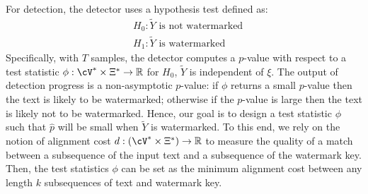%
For detection, the detector uses a hypothesis test defined as:
%
\begin{align}
    &H_0: \widetilde{Y} \text{ is not watermarked} \\
    &H_1: \widetilde{Y} \text{ is watermarked}
    \label{eq:hypothesis-test}
\end{align}
%
Specifically, with $T$ samples, the detector computes a $p$-value with respect to a test statistic $\phi: \cV^* \times \Xi^* \rightarrow \mathbb{R}$ for $H_0$, \ie $\widetilde{Y}$ is independent of $\xi$. The output of detection progress is a non-asymptotic $p$-value: if $\phi$ returns a small $p$-value then the text is likely to be watermarked; otherwise if the $p$-value is large then the text is likely not to be watermarked. Hence, our goal is to design a test statistic $\phi$ such that $\hat{p}$ will be small when $\widetilde{Y}$ is watermarked. To this end, we rely on the notion of alignment cost $d: (\cV^* \times \Xi^*) \rightarrow \mathbb{R}$ to measure the quality of a match between a subsequence of the input text and a subsequence of the watermark key. Then, the test statistics $\phi$ can be set as the minimum alignment cost between any length $k$ subsequences of text and watermark key. 